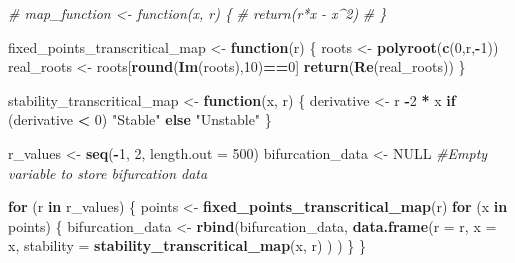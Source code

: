 \documentclass[
]{article}
\newenvironment{Shaded}{\begin{snugshade}}{\end{snugshade}}
\newcommand{\AttributeTok}[1]{\textcolor[rgb]{0.13,0.29,0.53}{#1}}
\newcommand{\CommentTok}[1]{\textcolor[rgb]{0.56,0.35,0.01}{\textit{#1}}}
\newcommand{\ConstantTok}[1]{\textcolor[rgb]{0.56,0.35,0.01}{#1}}
\newcommand{\ControlFlowTok}[1]{\textcolor[rgb]{0.13,0.29,0.53}{\textbf{#1}}}
\newcommand{\DecValTok}[1]{\textcolor[rgb]{0.00,0.00,0.81}{#1}}
\newcommand{\FunctionTok}[1]{\textcolor[rgb]{0.13,0.29,0.53}{\textbf{#1}}}
\newcommand{\NormalTok}[1]{#1}
\newcommand{\OtherTok}[1]{\textcolor[rgb]{0.56,0.35,0.01}{#1}}
\newcommand{\SpecialCharTok}[1]{\textcolor[rgb]{0.81,0.36,0.00}{\textbf{#1}}}
\newcommand{\StringTok}[1]{\textcolor[rgb]{0.31,0.60,0.02}{#1}}
\begin{document}
\begin{Shaded}
\begin{Highlighting}[]
\CommentTok{\# map\_function \textless{}{-} function(x, r) \{}
\CommentTok{\#   return(r*x {-} x\^{}2)}
\CommentTok{\# \}}

\NormalTok{fixed\_points\_transcritical\_map }\OtherTok{\textless{}{-}} \ControlFlowTok{function}\NormalTok{(r) \{}
\NormalTok{  roots }\OtherTok{\textless{}{-}} \FunctionTok{polyroot}\NormalTok{(}\FunctionTok{c}\NormalTok{(}\DecValTok{0}\NormalTok{,r,}\SpecialCharTok{{-}}\DecValTok{1}\NormalTok{))}
\NormalTok{  real\_roots }\OtherTok{\textless{}{-}}\NormalTok{ roots[}\FunctionTok{round}\NormalTok{(}\FunctionTok{Im}\NormalTok{(roots),}\DecValTok{10}\NormalTok{)}\SpecialCharTok{==}\DecValTok{0}\NormalTok{]}
  \FunctionTok{return}\NormalTok{(}\FunctionTok{Re}\NormalTok{(real\_roots))}
\NormalTok{\}}

\NormalTok{stability\_transcritical\_map }\OtherTok{\textless{}{-}} \ControlFlowTok{function}\NormalTok{(x, r) \{}
\NormalTok{  derivative }\OtherTok{\textless{}{-}}\NormalTok{ r }\SpecialCharTok{{-}}\DecValTok{2} \SpecialCharTok{*}\NormalTok{ x}
  \ControlFlowTok{if}\NormalTok{ (derivative }\SpecialCharTok{\textless{}} \DecValTok{0}\NormalTok{) }\StringTok{"Stable"} \ControlFlowTok{else} \StringTok{"Unstable"}
\NormalTok{\}}

\NormalTok{r\_values }\OtherTok{\textless{}{-}} \FunctionTok{seq}\NormalTok{(}\SpecialCharTok{{-}}\DecValTok{1}\NormalTok{, }\DecValTok{2}\NormalTok{, }\AttributeTok{length.out =} \DecValTok{500}\NormalTok{)}
\NormalTok{bifurcation\_data }\OtherTok{\textless{}{-}} \ConstantTok{NULL} \CommentTok{\#Empty variable to store bifurcation data}

\ControlFlowTok{for}\NormalTok{ (r }\ControlFlowTok{in}\NormalTok{ r\_values) \{}
\NormalTok{  points }\OtherTok{\textless{}{-}} \FunctionTok{fixed\_points\_transcritical\_map}\NormalTok{(r)}
  \ControlFlowTok{for}\NormalTok{ (x }\ControlFlowTok{in}\NormalTok{ points) \{}
\NormalTok{    bifurcation\_data }\OtherTok{\textless{}{-}} \FunctionTok{rbind}\NormalTok{(bifurcation\_data, }
                              \FunctionTok{data.frame}\NormalTok{(}\AttributeTok{r =}\NormalTok{ r, }
                                         \AttributeTok{x =}\NormalTok{ x, }
                                         \AttributeTok{stability =} \FunctionTok{stability\_transcritical\_map}\NormalTok{(x, r)}
\NormalTok{                                         )}
\NormalTok{                              )}
\NormalTok{  \}}
\NormalTok{\}}


\end{Highlighting}
\end{Shaded}
\end{document}
